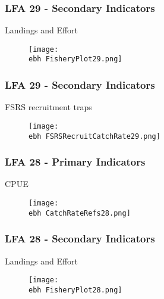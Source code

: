 \documentclass{beamer}
\newcommand{\ebh}{\string~/bio.data/bio.lobster/figures/Assessment/LFA2732/} %
\begin{document}
\begin{frame}
\frametitle{LFA 29 - Secondary Indicators}
Landings and Effort
\begin{figure}
        \begin{center}
            \texttt{[image: \\ebh FisheryPlot29.png]}
        \end{center}
    \end{figure}
\end{frame}



\begin{frame}
\frametitle{LFA 29 - Secondary Indicators}
FSRS recruitment traps
\begin{figure}
        \begin{center}
            \texttt{[image: \\ebh FSRSRecruitCatchRate29.png]}
        \end{center}
    \end{figure}
\end{frame}




\begin{frame}
\frametitle{LFA 28 - Primary Indicators}
CPUE
\begin{figure}
        \begin{center}
            \texttt{[image: \\ebh CatchRateRefs28.png]}
        \end{center}
    \end{figure}
\end{frame}





\begin{frame}
\frametitle{LFA 28 - Secondary Indicators}
Landings and Effort
\begin{figure}
        \begin{center}
            \texttt{[image: \\ebh FisheryPlot28.png]}
        \end{center}
    \end{figure}
\end{frame}
\end{document}
